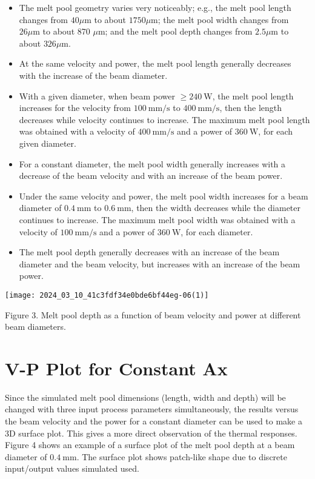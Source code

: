 \documentclass[10pt]{article}
\begin{document}
\begin{itemize}
  \item The melt pool geometry varies very noticeably; e.g., the melt pool length changes from $40 \mu \mathrm{m}$ to about $1750 \mu \mathrm{m}$; the melt pool width changes from $26 \mu \mathrm{m}$ to about 870 $\mu \mathrm{m}$; and the melt pool depth changes from $2.5 \mu \mathrm{m}$ to about $326 \mu \mathrm{m}$.

  \item At the same velocity and power, the melt pool length generally decreases with the increase of the beam diameter.

  \item With a given diameter, when beam power $\geq 240 \mathrm{~W}$, the melt pool length increases for the velocity from $100 \mathrm{~mm} / \mathrm{s}$ to $400 \mathrm{~mm} / \mathrm{s}$, then the length decreases while velocity continues to increase. The maximum melt pool length was obtained with a velocity of $400 \mathrm{~mm} / \mathrm{s}$ and a power of $360 \mathrm{~W}$, for each given diameter.

  \item For a constant diameter, the melt pool width generally increases with a decrease of the beam velocity and with an increase of the beam power.

  \item Under the same velocity and power, the melt pool width increases for a beam diameter of $0.4 \mathrm{~mm}$ to $0.6 \mathrm{~mm}$, then the width decreases while the diameter continues to increase. The maximum melt pool width was obtained with a velocity of $100 \mathrm{~mm} / \mathrm{s}$ and a power of $360 \mathrm{~W}$, for each diameter.

  \item The melt pool depth generally decreases with an increase of the beam diameter and the beam velocity, but increases with an increase of the beam power.

\end{itemize}

\begin{center}
\texttt{[image: 2024\_03\_10\_41c3fdf34e0bde6bf44eg-06(1)]}
\end{center}

Figure 3. Melt pool depth as a function of beam velocity and power at different beam diameters.

\section*{V-P Plot for Constant Ax}
Since the simulated melt pool dimensions (length, width and depth) will be changed with three input process parameters simultaneously, the results versus the beam velocity and the power for a constant diameter can be used to make a 3D surface plot. This gives a more direct observation of the thermal responses. Figure 4 shows an example of a surface plot of the melt pool depth at a beam diameter of $0.4 \mathrm{~mm}$. The surface plot shows patch-like shape due to discrete input/output values simulated used.
\end{document}
